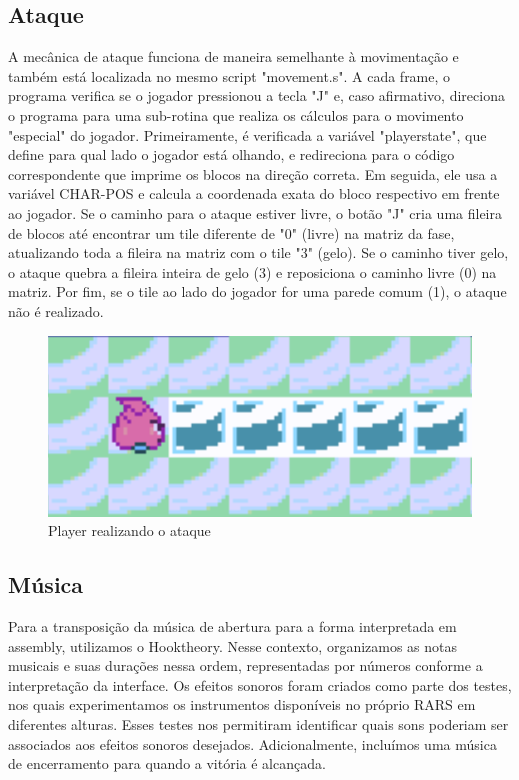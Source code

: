 \documentclass[a4paper]{sbgames}
\begin{document}
\subsection{Ataque}{
\label{sec:att}

A mecânica de ataque funciona de maneira semelhante à movimentação e também está localizada no mesmo script "movement.s". A cada frame, o programa verifica se o jogador pressionou a tecla "J" e, caso afirmativo, direciona o programa para uma sub-rotina que realiza os cálculos para o movimento "especial" do jogador. Primeiramente, é verificada a variável "playerstate", que define para qual lado o jogador está olhando, e redireciona para o código correspondente que imprime os blocos na direção correta. Em seguida, ele usa a variável CHAR-POS e calcula a coordenada exata do bloco respectivo em frente ao jogador. Se o caminho para o ataque estiver livre, o botão "J" cria uma fileira de blocos até encontrar um tile diferente de "0" (livre) na matriz da fase, atualizando toda a fileira na matriz com o tile "3" (gelo). Se o caminho tiver gelo, o ataque quebra a fileira inteira de gelo (3) e reposiciona o caminho livre (0) na matriz. Por fim, se o tile ao lado do jogador for uma parede comum (1), o ataque não é realizado.
}
\begin{figure}[H]
  \begin{center}
   \includegraphics[width=1.0\linewidth]{./Figures/ataque.PNG}
  \end{center}
  \caption{Player realizando o ataque}
  \label{fig:05}
  \end{figure}

\subsection{Música}{
\label{sec:music}

Para a transposição da música de abertura para a forma interpretada em assembly, utilizamos o Hooktheory. Nesse contexto, organizamos as notas musicais e suas durações nessa ordem, representadas por números conforme a interpretação da interface. Os efeitos sonoros foram criados como parte dos testes, nos quais experimentamos os instrumentos disponíveis no próprio RARS em diferentes alturas. Esses testes nos permitiram identificar quais sons poderiam ser associados aos efeitos sonoros desejados. Adicionalmente, incluímos uma música de encerramento para quando a vitória é alcançada.
}
\end{document}
